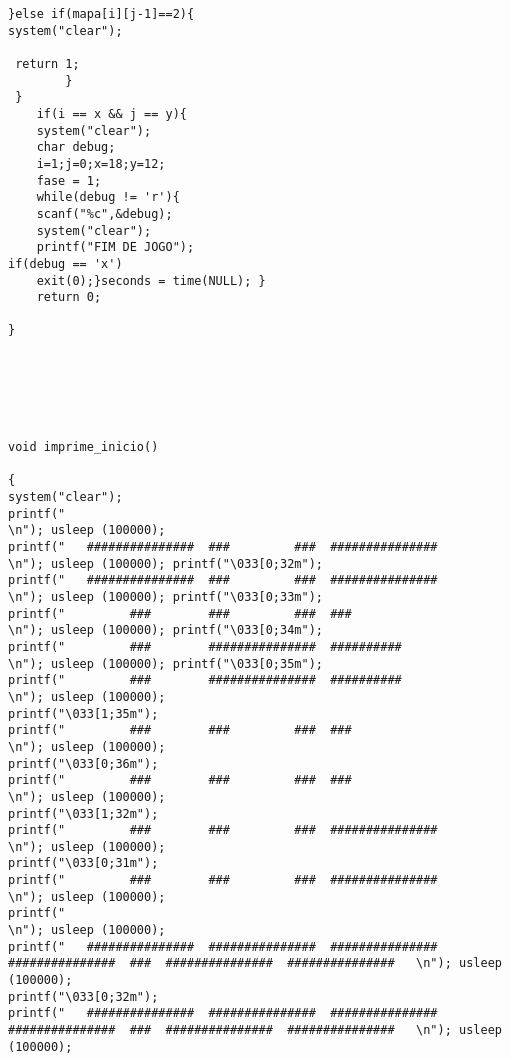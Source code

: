 \documentclass[journal]{IEEEtran}
\begin{document}
\begin{verbatim}
}else if(mapa[i][j-1]==2){
system("clear");
          
 return 1;
        }
 }
    if(i == x && j == y){
    system("clear");
    char debug; 
    i=1;j=0;x=18;y=12; 
    fase = 1; 
    while(debug != 'r'){
    scanf("%c",&debug); 
    system("clear");
    printf("FIM DE JOGO");                                          if(debug == 'x') 
    exit(0);}seconds = time(NULL); }
	return 0;

}






void imprime_inicio()

{
system("clear");
printf("                                                                                                               \n"); usleep (100000);
printf("   ###############  ###         ###  ###############                                                           \n"); usleep (100000); printf("\033[0;32m");
printf("   ###############  ###         ###  ###############                                                           \n"); usleep (100000); printf("\033[0;33m");
printf("         ###        ###         ###  ###                                                                       \n"); usleep (100000); printf("\033[0;34m");
printf("         ###        ###############  ##########                                                                \n"); usleep (100000); printf("\033[0;35m");
printf("         ###        ###############  ##########                                                                \n"); usleep (100000);
printf("\033[1;35m");
printf("         ###        ###         ###  ###                                                                       \n"); usleep (100000);
printf("\033[0;36m");
printf("         ###        ###         ###  ###                                                                       \n"); usleep (100000);
printf("\033[1;32m");
printf("         ###        ###         ###  ###############                                                           \n"); usleep (100000);
printf("\033[0;31m");
printf("         ###        ###         ###  ###############                                                           \n"); usleep (100000);
printf("                                                                                                               \n"); usleep (100000);
printf("   ###############  ###############  ###############  ###############  ###  ###############  ###############   \n"); usleep (100000);
printf("\033[0;32m");
printf("   ###############  ###############  ###############  ###############  ###  ###############  ###############   \n"); usleep (100000);

\end{verbatim}
\end{document}
